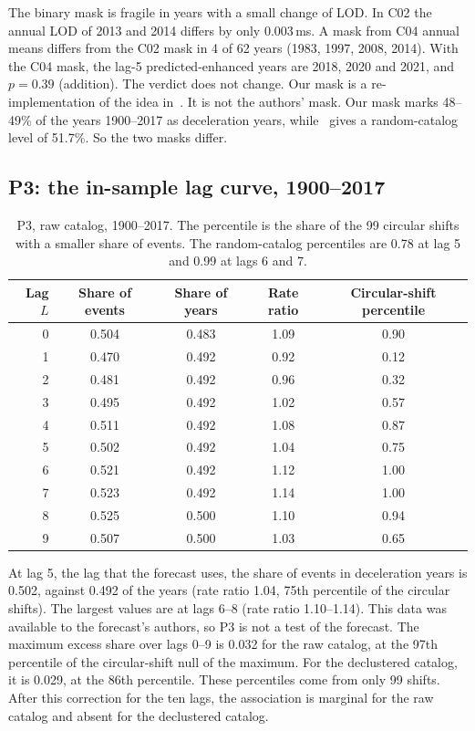 \documentclass[11pt]{article}
\begin{document}
The binary mask is fragile in years with a small change of LOD. In C02 the annual LOD of 2013 and 2014 differs by only 0.003\,ms. A mask from C04 annual means differs from the C02 mask in 4 of 62 years (1983, 1997, 2008, 2014). With the C04 mask, the lag-5 predicted-enhanced years are 2018, 2020 and 2021, and $p = 0.39$ (addition). The verdict does not change. Our mask is a re-implementation of the idea in~\cite{bilham2022}. It is not the authors' mask. Our mask marks 48--49\% of the years 1900--2017 as deceleration years, while~\cite{bilham2022} gives a random-catalog level of 51.7\%. So the two masks differ.

\subsection{P3: the in-sample lag curve, 1900--2017}
\begin{table}[t]
\centering\small
\begin{tabular}{rcccc}
\toprule
Lag $L$ & Share of events & Share of years & Rate ratio & Circular-shift percentile\\
\midrule
0 & 0.504 & 0.483 & 1.09 & 0.90\\
1 & 0.470 & 0.492 & 0.92 & 0.12\\
2 & 0.481 & 0.492 & 0.96 & 0.32\\
3 & 0.495 & 0.492 & 1.02 & 0.57\\
4 & 0.511 & 0.492 & 1.08 & 0.87\\
5 & 0.502 & 0.492 & 1.04 & 0.75\\
6 & 0.521 & 0.492 & 1.12 & 1.00\\
7 & 0.523 & 0.492 & 1.14 & 1.00\\
8 & 0.525 & 0.500 & 1.10 & 0.94\\
9 & 0.507 & 0.500 & 1.03 & 0.65\\
\bottomrule
\end{tabular}
\caption{P3, raw catalog, 1900--2017. The percentile is the share of the 99 circular shifts with a smaller share of events. The random-catalog percentiles are 0.78 at lag 5 and 0.99 at lags 6 and 7.}
\end{table}
At lag 5, the lag that the forecast uses, the share of events in deceleration years is 0.502, against 0.492 of the years (rate ratio 1.04, 75th percentile of the circular shifts). The largest values are at lags 6--8 (rate ratio 1.10--1.14). This data was available to the forecast's authors, so P3 is not a test of the forecast. The maximum excess share over lags 0--9 is 0.032 for the raw catalog, at the 97th percentile of the circular-shift null of the maximum. For the declustered catalog, it is 0.029, at the 86th percentile. These percentiles come from only 99 shifts. After this correction for the ten lags, the association is marginal for the raw catalog and absent for the declustered catalog.
\end{document}
